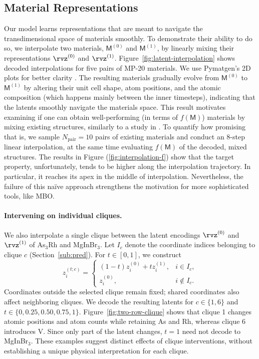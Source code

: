\documentclass{article}
\theoremstyle{plain}
\theoremstyle{definition}
\theoremstyle{remark}
\begin{document}
\subsection{Material Representations}
\vspace{-5pt}
Our model learns representations that are meant to navigate the transdimensional space of materials smoothly. 
To demonstrate their ability to do so, we interpolate two materials, $\mathsf{M}^{(0)}$ and $\mathsf{M}^{(1)}$, by linearly mixing their representations $\rvz^{(0)}$ and $\rvz^{(1)}$.
Figure~\ref{fig:latent-interpolation} shows decoded interpolations for five pairs of MP-20 materials. 
We use Pymatgen's 2D plots for better clarity \citep{ong2013python}.
The resulting materials gradually evolve from $\mathsf{M}^{(0)}$ to $\mathsf{M}^{(1)}$ by altering their unit cell shape, atom positions, and the atomic composition (which happens mainly between the inner timesteps), indicating that the latents smoothly navigate the materials space.
This result motivates examining if one can obtain well-performing (in terms of $f(\mathsf{M})$) materials by mixing existing structures, similarly to a study in \citet{gomez2018automatic}.
To quantify how promising that is, we sample $N_{\text{pair}}=10$ pairs of existing materials and conduct an 8-step linear interpolation, at the same time evaluating $f(\mathsf{M})$ of the decoded, mixed structures.
The results in Figure (\ref{fig:interpolation-f}) show that the target property, unfortunately, tends to be higher along the interpolation trajectory.
In particular, it reaches its apex in the middle of interpolation.
Nevertheless, the failure of this na\"ive approach strengthens the motivation for more sophisticated tools, like MBO.


\paragraph{Intervening on individual cliques.}
We also interpolate a single clique between the latent encodings $\rvz^{(0)}$ and $\rvz^{(1)}$ of As$_3$Rh and MgInBr$_3$. Let $I_c$ denote the coordinate indices belonging to clique $c$ (Section~\ref{sub:pred}). For $t\in[0,1]$, we construct
\begin{equation}
    \label{eq:single-clique-interpolation}
    z_i^{(t;c)} =
    \begin{cases}
        (1-t)z_i^{(0)} + t z_i^{(1)}, & i\in I_c,\\
        z_i^{(0)}, & i\notin I_c.
    \end{cases}
\end{equation}
Coordinates outside the selected clique remain fixed; shared coordinates also affect neighboring cliques. We decode the resulting latents for $c\in\{1,6\}$ and $t\in\{0,0.25,0.50,0.75,1\}$. Figure~\ref{fig:two-row-clique} shows that clique 1 changes atomic positions and atom counts while retaining As and Rh, whereas clique 6 introduces V. Since only part of the latent changes, $t=1$ need not decode to MgInBr$_3$. These examples suggest distinct effects of clique interventions, without establishing a unique physical interpretation for each clique.
\end{document}
